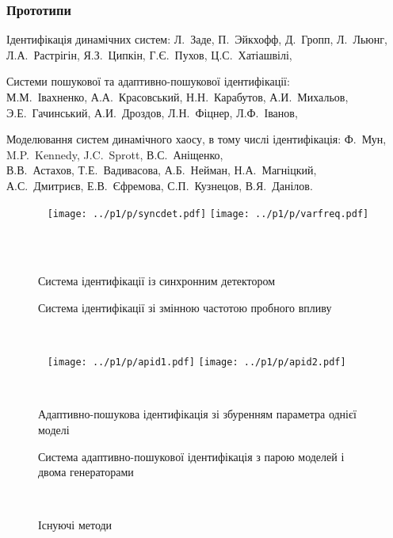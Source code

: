 \documentclass[14pt,handout,utf8]{beamer}
\newlength\TW
\newcommand{\Xhead}[1]{
 \begin{center}%
      \textbf{#1}%
 \end{center}%
}
\begin{document}

\begin{frame}
  \frametitle{Прототипи}

  \Xhead{}

  Ідентифікація динамічних систем:
  Л.~Заде,
  П.~Эйкхофф,
  Д.~Гропп,
  Л.~Льюнг,
  Л.А.~Растрігін,
  Я.З.~Ципкін,
  Г.Є.~Пухов,
  Ц.С.~Хатіашвілі,

  \vfill


Системи пошукової та адаптивно-пошукової ідентифікації:\\
  М.М.~Івахненко,
  А.А.~Красовський,
  Н.Н.~Карабутов,
  А.И.~Михальов,
  Э.Е.~Гачинський,
  А.И.~Дроздов,
  Л.Н.~Фіцнер,
  Л.Ф.~Іванов,

  \vfill

Моделювання систем динамічного хаосу, в тому числі ідентифікація:
  Ф.~Мун,
  M.P.~Kennedy,
  J.C.~Sprott,
  В.С.~Аніщенко,\\
  В.В.~Астахов,
  Т.Е.~Вадивасова,
  А.Б.~Нейман,
  Н.А.~Магніцкий,\\
  А.С.~Дмитриєв,
  Е.В.~Єфремова,
  С.П.~Кузнецов,
  В.Я.~Данілов.

  \begin{figure}
    \begin{center}
      ~ \hfill
      \texttt{[image: ../p1/p/syncdet.pdf]}
      \hfill
      \texttt{[image: ../p1/p/varfreq.pdf]}
      \hfill ~
    \end{center}
    \begin{center}
      ~ \hfill
      \parbox[t]{48\TW}{\centering Система ідентифікації із синхронним детектором}
      \hfill
      \parbox[t]{48\TW}{\centering Система ідентифікації зі змінною частотою пробного впливу}
      \hfill ~
    \end{center}
    \begin{center}
      ~ \hfill
      \texttt{[image: ../p1/p/apid1.pdf]}
      \hfill
      \texttt{[image: ../p1/p/apid2.pdf]}
      \hfill ~
    \end{center}
    \begin{center}
      ~ \hfill
      \parbox[t]{48\TW}{\centering Адаптивно-пошукова ідентифікація зі збуренням параметра однієї моделі}
      \hfill
      \parbox[t]{48\TW}{\centering Система адаптивно-пошукової ідентифікація з парою моделей і двома генераторами}
      \hfill ~
    \end{center}
    \label{atu:f:oldsch}
    \vspace{-2ex}
    \caption{Існуючі методи}
  \end{figure}



\end{frame}
\end{document}
